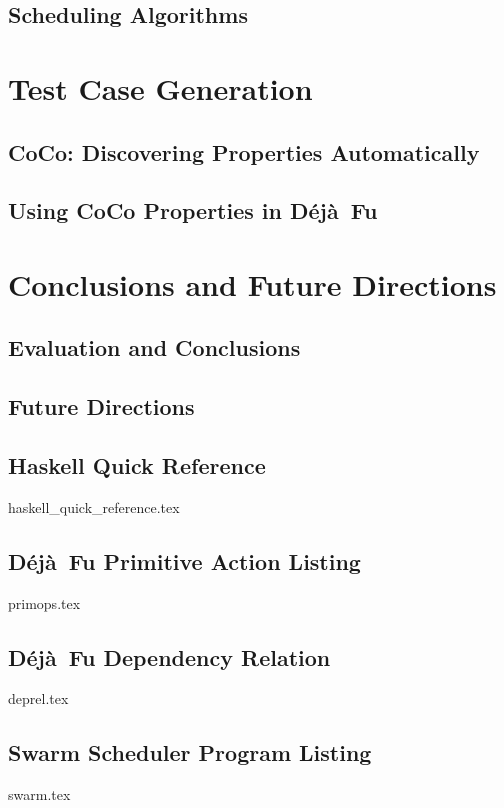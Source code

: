 \documentclass[openright,imperial,11pt]{octavo}
\newcommand{\dejafu}{D\'{e}j\`{a}~Fu}
\begin{document}
\chapter{Scheduling Algorithms}
\label{chp:algorithms}


\part{Test Case Generation}
\label{part:properties}

\chapter{CoCo: Discovering Properties Automatically}
\label{chp:coco}


\chapter{Using CoCo Properties in \dejafu{}}
\label{chp:coco_and_dejafu}


\part{Conclusions and Future Directions}
\label{part:end}

\chapter{Evaluation and Conclusions}
\label{chp:conclusions}


\chapter{Future Directions}
\label{chp:future_work}


\begin{appendices}
\chapter{Haskell Quick Reference}
\label{app:haskell}
{haskell_quick_reference.tex}

\chapter{\dejafu{} Primitive Action Listing}
\label{app:primops}
{primops.tex}

\chapter{\dejafu{} Dependency Relation}
\label{app:deprel}
{deprel.tex}

\chapter{Swarm Scheduler Program Listing}
\label{app:swarm}
{swarm.tex}
\end{appendices}

\printbibliography[heading=bibintoc]
\end{document}
